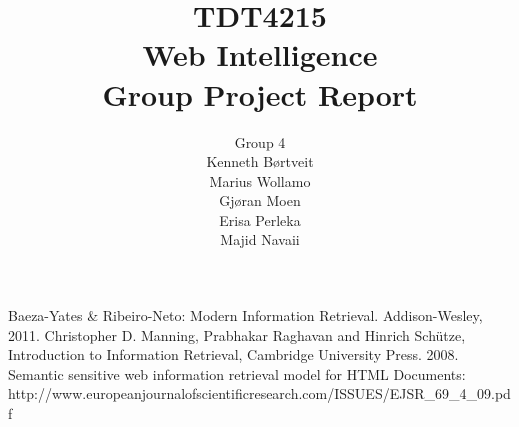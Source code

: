 \documentclass[a4paper, 11pt]{report}
\title{TDT4215 \\ Web Intelligence \\ Group Project Report}
\author{\Huge{Group 4} \vspace{2mm} \\ Kenneth Børtveit \\ Marius Wollamo \\ Gjøran Moen \\ Erisa Perleka \\ Majid Navaii}
\begin{document}
\maketitle
\tableofcontents
\listoffigures
\listoftables









\begin{thebibliography}{10}
Baeza-Yates \& Ribeiro-Neto: Modern Information Retrieval. Addison-Wesley, 2011.
Christopher D. Manning, Prabhakar Raghavan and Hinrich Schütze, Introduction to Information Retrieval, Cambridge University Press. 2008.
Semantic sensitive web information retrieval model for HTML Documents: http://www.europeanjournalofscientificresearch.com/ISSUES/EJSR\_69\_4\_09.pdf
\end{thebibliography}
\end{document}
